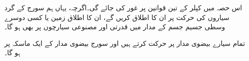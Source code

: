 اس حصہ میں کپلر کے تین قوانین پر غور کی جائے گی۔اگرچہ، یہاں ہم سورج کے گرد سیاروں  کی حرکت پر ان کا اطلاق کریں گے، ان کا  اطلاق  زمین یا کسی دوسرے وسطی جسیم  جسم کے مدار میں قدرتی اور مصنوعی   سیارچوں پر بھی ہو گا۔

  تمام سیارے بیضوی مدار پر حرکت کرتے ہیں اور سورج   بیضوی مدار کے ایک ماسکہ پر   ہو گا۔
